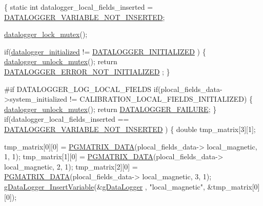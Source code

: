 \begin{DoxyCode}
\{
    \textcolor{keyword}{static} \textcolor{keywordtype}{int} datalogger\_local\_fields\_inserted = 
      \hyperlink{datalogger_01_07Caio-PC's_01conflicted_01copy_012012-11-23_08_8h_a1f4fd2dbd981cf35467ab688c9157a74}{DATALOGGER\_VARIABLE\_NOT\_INSERTED};

    \hyperlink{datalogger_01_07Caio-PC's_01conflicted_01copy_012012-11-23_08_8c_a54b06d9395b2e370a5a72beb7f9524b2}{datalogger\_lock\_mutex}();

    \textcolor{keywordflow}{if}(\hyperlink{datalogger_01_07Caio-PC's_01conflicted_01copy_012012-11-23_08_8c_a35e8fbe04b90452afdc3c1be16ff6187}{datalogger\_initialized} != \hyperlink{datalogger_01_07Caio-PC's_01conflicted_01copy_012012-11-23_08_8h_a684c343d340004b77ca2b782934c96ca}{DATALOGGER\_INITIALIZED}
      )
    \{
        \hyperlink{datalogger_01_07Caio-PC's_01conflicted_01copy_012012-11-23_08_8c_a85453211c0c809083c36cc56b275aeeb}{datalogger\_unlock\_mutex}();
        \textcolor{keywordflow}{return} \hyperlink{datalogger_01_07Caio-PC's_01conflicted_01copy_012012-11-23_08_8h_a60df7fe0e61b757ad6a9db106b0eb43e}{DATALOGGER\_ERROR\_NOT\_INITIALIZED}
      ;
    \}

\textcolor{preprocessor}{    #if DATALOGGER\_LOG\_LOCAL\_FIELDS}
\textcolor{preprocessor}{}    \textcolor{keywordflow}{if}(plocal\_fields\_data->system\_initialized != 
      CALIBRATION\_LOCAL\_FIELDS\_INITIALIZED)
    \{
        \hyperlink{datalogger_01_07Caio-PC's_01conflicted_01copy_012012-11-23_08_8c_a85453211c0c809083c36cc56b275aeeb}{datalogger\_unlock\_mutex}();
        \textcolor{keywordflow}{return} \hyperlink{datalogger_01_07Caio-PC's_01conflicted_01copy_012012-11-23_08_8h_ac52138ca42979f6e1f1d589020ff9f83}{DATALOGGER\_FAILURE};
    \}
    \textcolor{keywordflow}{if}(datalogger\_local\_fields\_inserted == \hyperlink{datalogger_01_07Caio-PC's_01conflicted_01copy_012012-11-23_08_8h_a1f4fd2dbd981cf35467ab688c9157a74}{DATALOGGER\_VARIABLE\_NOT\_INSERTED}
      )
    \{
        \textcolor{keywordtype}{double} tmp\_matrix[3][1];

        tmp\_matrix[0][0] = \hyperlink{gmatrix_8h_a7333180c47234295df2bd7b09ac00da8}{PGMATRIX\_DATA}(plocal\_fields\_data->
      local\_magnetic, 1, 1);
        tmp\_matrix[1][0] = \hyperlink{gmatrix_8h_a7333180c47234295df2bd7b09ac00da8}{PGMATRIX\_DATA}(plocal\_fields\_data->
      local\_magnetic, 2, 1);
        tmp\_matrix[2][0] = \hyperlink{gmatrix_8h_a7333180c47234295df2bd7b09ac00da8}{PGMATRIX\_DATA}(plocal\_fields\_data->
      local\_magnetic, 3, 1);
        \hyperlink{gdatalogger_8c_a32674e7c2afa8b78e99a0070cf4bcaf9}{gDataLogger\_InsertVariable}(&\hyperlink{datalogger_01_07Caio-PC's_01conflicted_01copy_012012-11-23_08_8c_abe3b9c2c4e21e79c7b046b5986d13acc}{gDataLogger}
      , \textcolor{stringliteral}{"local\_magnetic"}, &tmp\_matrix[0][0]);


\end{DoxyCode}
